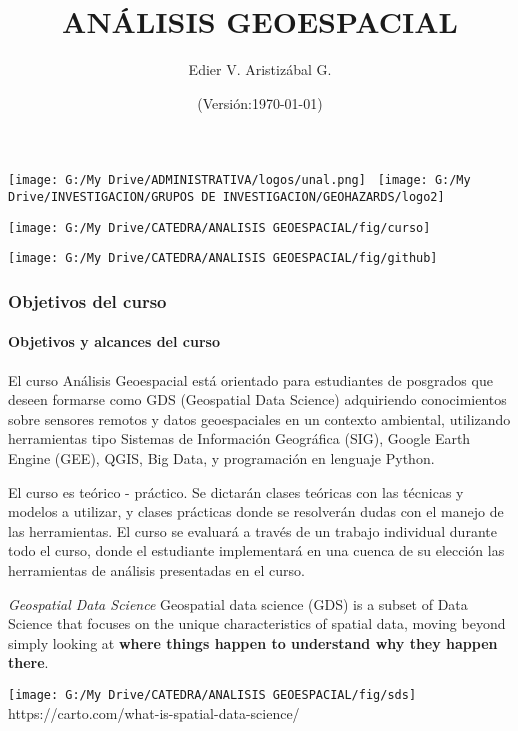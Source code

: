 \documentclass[12pt]{beamer}
\title[Introducción]{ANÁLISIS GEOESPACIAL}
\author[Edier Aristizábal]{Edier V. Aristizábal G.}
\institute{\emph{evaristizabalg@unal.edu.co}}
\date{(Versión:\today)}
\begin{document}
\begin{frame}
\titlepage
\centering
	\texttt{[image: G:/My Drive/ADMINISTRATIVA/logos/unal.png]}\hspace*{4.75cm}~%
   	\texttt{[image: G:/My Drive/INVESTIGACION/GRUPOS DE INVESTIGACION/GEOHAZARDS/logo2]} 
\end{frame}
\begin{frame}
\centering
	\texttt{[image: G:/My Drive/CATEDRA/ANALISIS GEOESPACIAL/fig/curso]}
\end{frame}
 \begin{frame}
\centering
	\texttt{[image: G:/My Drive/CATEDRA/ANALISIS GEOESPACIAL/fig/github]}
\end{frame}
\begin{frame}
\frametitle{Objetivos del curso}
\framesubtitle{Objetivos y alcances del curso}
\justifying
El curso \alert{Análisis Geoespacial} está orientado para estudiantes de posgrados que deseen formarse como GDS (Geospatial Data Science) adquiriendo conocimientos sobre sensores remotos y datos geoespaciales en un contexto ambiental, utilizando herramientas tipo Sistemas de Información Geográfica (SIG), Google Earth Engine (GEE), QGIS, Big Data, y programación en lenguaje Python.\vfill

El curso es teórico - práctico. Se dictarán clases teóricas con las técnicas y modelos a utilizar, y clases prácticas donde se resolverán dudas con el manejo de las herramientas. El curso se evaluará a través de un trabajo individual durante todo el curso, donde el estudiante implementará en una cuenca de su elección las herramientas de análisis presentadas en el curso.
\end{frame}
\begin{frame}
\begin{block}{\emph{Geospatial Data Science}}
\justifying
\small{Geospatial data science (GDS) is a subset of Data Science that focuses on the unique characteristics of spatial data, moving beyond simply looking at \textbf{where things happen to understand why they happen there}}.
\end{block}
\centering
	\texttt{[image: G:/My Drive/CATEDRA/ANALISIS GEOESPACIAL/fig/sds]}\vfill
\tiny{https://carto.com/what-is-spatial-data-science/}
\end{frame}
\end{document}
